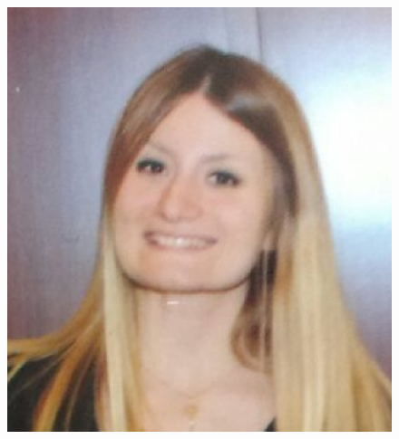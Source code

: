 \documentclass[margin,line]{res}
\begin{document}
\begin{figure}
\vspace{-2cm}

\hfill
\includegraphics[scale=0.31]{elguz.eps}

\vspace{-1cm}

\end{figure}

\end{document}
